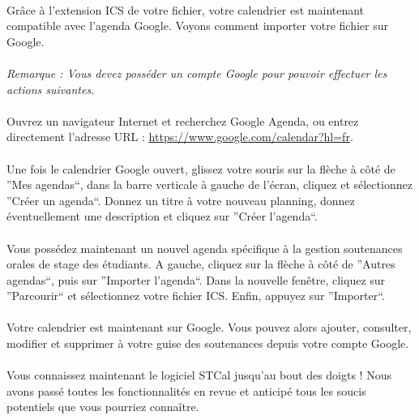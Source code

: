 \documentclass[a4paper,10pt]{report}
\begin{document}
	\paragraph{}
	  Grâce à l'extension ICS de votre fichier, votre calendrier est maintenant compatible avec l'agenda Google.
	  Voyons comment importer votre fichier sur Google.
	  
	  
	\paragraph{}
	  \textit{Remarque : Vous devez posséder un compte Google pour pouvoir effectuer les actions suivantes.}
	
	\paragraph{}
	  Ouvrez un navigateur Internet et recherchez Google Agenda, ou entrez directement l'adresse URL : \url{https://www.google.com/calendar?hl=fr}.
	  ~\\~\\
	  Une fois le calendrier Google ouvert, glissez votre souris sur la flèche à côté de ''Mes agendas``, dans la barre verticale à gauche de l'écran, cliquez et sélectionnez ''Créer un agenda``.
	  Donnez un titre à votre nouveau planning, donnez éventuellement une description et cliquez sur ''Créer l'agenda``.
	  ~\\~\\
	  Vous possédez maintenant un nouvel agenda spécifique à la gestion soutenances orales de stage des étudiants.
	  A gauche, cliquez sur la flèche à côté de ''Autres agendas``, puis sur ''Importer l'agenda``.
	  Dans la nouvelle fenêtre, cliquez sur ''Parcourir`` et sélectionnez votre fichier ICS.
	  Enfin, appuyez sur ''Importer``.
	  
	\paragraph{}
	  Votre calendrier est maintenant sur Google.
	  Vous pouvez alors ajouter, consulter, modifier et supprimer à votre guise des soutenances depuis votre compte Google.
	  
	\newpage
	\paragraph{}
	  Vous connaissez maintenant le logiciel STCal jusqu'au bout des doigts ! 
	  Nous avons passé toutes les fonctionnalités en revue et anticipé tous les soucis potentiels que vous pourriez connaître.
	  
\end{document}
